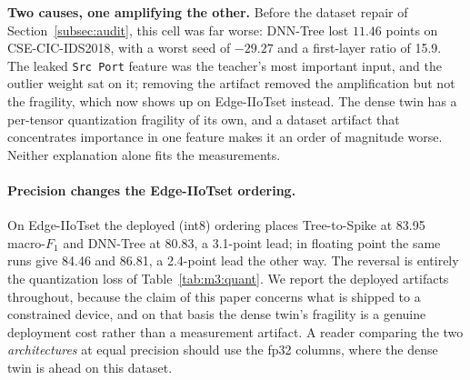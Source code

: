 \textbf{Two causes, one amplifying the other.} Before the dataset repair of
Section~\ref{subsec:audit}, this cell was far worse: DNN-Tree lost $11.46$ points
on CSE-CIC-IDS2018, with a worst seed of $-29.27$ and a first-layer ratio of
15.9. The leaked \texttt{Src~Port} feature was the teacher's most important
input, and the outlier weight sat on it; removing the artifact removed the
amplification but not the fragility, which now shows up on Edge-IIoTset instead.
The dense twin has a per-tensor quantization fragility of its own, and a dataset
artifact that concentrates importance in one feature makes it an order of
magnitude worse. Neither explanation alone fits the measurements.

\paragraph{Precision changes the Edge-IIoTset ordering.}
On Edge-IIoTset the deployed (int8) ordering places Tree-to-Spike at 83.95
macro-$F_1$ and DNN-Tree at 80.83, a 3.1-point lead; in floating point the same
runs give 84.46 and 86.81, a 2.4-point lead the other way. The reversal is
entirely the quantization loss of Table~\ref{tab:m3:quant}. We report the
deployed artifacts throughout, because the claim of this paper concerns what is
shipped to a constrained device, and on that basis the dense twin's fragility is
a genuine deployment cost rather than a measurement artifact. A reader comparing
the two \emph{architectures} at equal precision should use the fp32 columns,
where the dense twin is ahead on this dataset.
